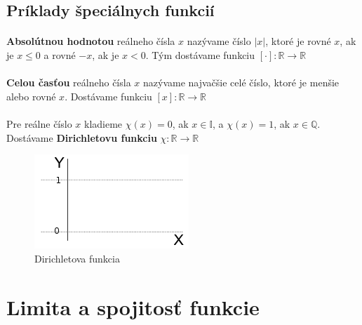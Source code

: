 \documentclass[12pt,a4paper]{article}
\begin{document}
\subsection{Príklady špeciálnych funkcií}
\paragraph{}
\textbf{Absolútnou hodnotou} reálneho čísla $x$ nazývame číslo $|x|$, ktoré je rovné $x$, ak je $x\leq 0$ a rovné $-x$, ak je $x<0$. Tým dostávame funkciu $[\cdot]:\mathds{R}\rightarrow\mathds{R}$ \\ \vspace{-1cm}
\paragraph{}
\textbf{Celou časťou} reálneho čísla $x$ nazývame najvačšie celé číslo, ktoré je menšie alebo rovné $x$. Dostávame funkciu $[x]:\mathds{R}\rightarrow\mathds{R}$ \\ \vspace{-1cm}
\paragraph{}
Pre reálne číslo $x$ kladieme $\chi(x)=0$, ak $x\in \mathds{I}$, a $\chi(x)=1$, ak $x\in \mathds{Q}$. Dostávame \textbf{Dirichletovu funkciu} $\chi:\mathds{R}\rightarrow\mathds{R}$

\begin{figure}[ht]
	\begin{center}
		\includegraphics{img/dirichletova_funkce}
	\end{center}
	\caption{Dirichletova funkcia}
\end{figure}

\section{Limita a spojitosť funkcie}
\end{document}

